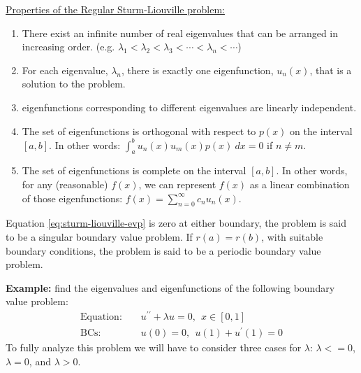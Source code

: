 \vspace{0.5cm}

\noindent\underline{Properties of the Regular Sturm-Liouville problem:}
\begin{enumerate}
\item There exist an infinite number of real eigenvalues that can be arranged in increasing order. (e.g. $\lambda_1 < \lambda_2 < \lambda_3 < \cdots < \lambda_n < \cdots$)
\item For each eigenvalue, $\lambda_n$, there is exactly one eigenfunction, $u_n(x)$, that is a solution to the problem.

\item eigenfunctions corresponding to different eigenvalues are linearly independent.

\item The set of eigenfunctions is orthogonal with respect to $p(x)$ on the interval $[a,b]$.  In other words: $\int_{a}^{b}u_n(x) u_m(x) p(x) \ dx = 0$ if $n \ne m$.

\item The set of eigenfunctions is complete on the interval $[a,b]$.  In other words, for any (reasonable) $f(x)$, we can represent $f(x)$ as a linear combination of those eigenfunctions: $f(x) = \sum_{n=0}^{\infty} c_n u_n(x)$.
\end{enumerate}


 Equation \ref{eq:sturm-liouville-evp} is zero at either boundary, the problem is said to be a singular boundary value problem.  If $r(a) = r(b)$, with suitable boundary conditions, the problem is said to be a periodic boundary value problem.

\vspace{1.0cm}

\noindent\textbf{Example:} find the eigenvalues and eigenfunctions of the following boundary value problem:
\begin{align*}
\text{Equation: }& & u^{\prime \prime}+\lambda u = 0,  \ \ x\in[0,1] \\
\text{BCs: }& & u(0) = 0, \ \ u(1) + u^{\prime}(1) = 0
\end{align*}
To fully analyze this problem we will have to consider three cases for $\lambda$: $\lambda < =0$, $\lambda = 0$, and $\lambda > 0$.

